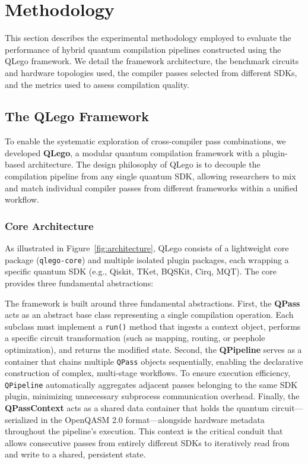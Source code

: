 \documentclass[conference]{IEEEtran}
\begin{document}
\section{Methodology}
\label{sec:methodology}

This section describes the experimental methodology employed to evaluate the performance of hybrid quantum compilation pipelines constructed using the QLego framework. We detail the framework architecture, the benchmark circuits and hardware topologies used, the compiler passes selected from different SDKs, and the metrics used to assess compilation quality.

\subsection{The QLego Framework}
\label{subsec:framework}

To enable the systematic exploration of cross-compiler pass combinations, we developed \textbf{QLego}, a modular quantum compilation framework with a plugin-based architecture. The design philosophy of QLego is to decouple the compilation pipeline from any single quantum SDK, allowing researchers to mix and match individual compiler passes from different frameworks within a unified workflow.

\subsubsection{Core Architecture}

As illustrated in Figure~\ref{fig:architecture}, QLego consists of a lightweight core package (\texttt{qlego-core}) and multiple isolated plugin packages, each wrapping a specific quantum SDK (e.g., Qiskit, TKet, BQSKit, Cirq, MQT). The core provides three fundamental abstractions:

The framework is built around three fundamental abstractions. First, the \textbf{QPass} acts as an abstract base class representing a single compilation operation. Each subclass must implement a \texttt{run()} method that ingests a context object, performs a specific circuit transformation (such as mapping, routing, or peephole optimization), and returns the modified state. Second, the \textbf{QPipeline} serves as a container that chains multiple \texttt{QPass} objects sequentially, enabling the declarative construction of complex, multi-stage workflows. To ensure execution efficiency, \texttt{QPipeline} automatically aggregates adjacent passes belonging to the same SDK plugin, minimizing unnecessary subprocess communication overhead. Finally, the \textbf{QPassContext} acts as a shared data container that holds the quantum circuit---serialized in the OpenQASM 2.0 format---alongside hardware metadata throughout the pipeline's execution. This context is the critical conduit that allows consecutive passes from entirely different SDKs to iteratively read from and write to a shared, persistent state.
\end{document}
